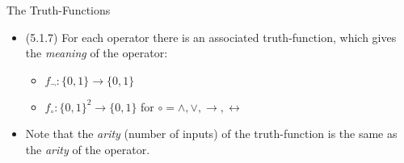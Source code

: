 \begin{frame}{The Truth-Functions}
	
	\begin{itemize}
	
		\item (5.1.7) For each operator there is an associated truth-function, which gives the \emph{meaning} of the operator:
		
		\begin{itemize}
		
			\item $f_\neg:\{0,1\}\to\{0,1\}$
		
			 \item $f_\circ:\{0,1\}^2\to\{0,1\}$ for $\circ=\land,\lor,\to,\leftrightarrow$
		
		\end{itemize}
		
		\item Note that the \emph{arity} (number of inputs) of the truth-function is the same as the \emph{arity} of the operator.

	\end{itemize}

\end{frame}


